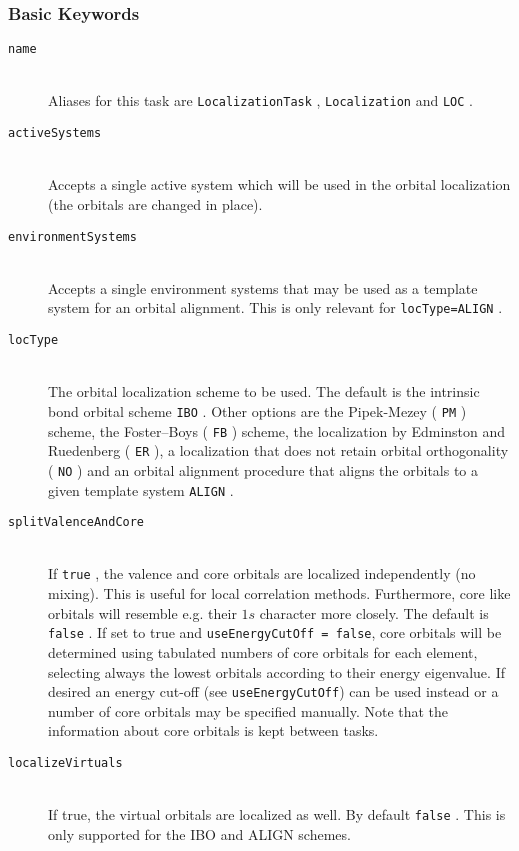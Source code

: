 \documentclass[bibliography=totocnumbered,a4paper,10pt,oneside]{scrbook}
\newcommand{\ttt}[1]{%
  \begingroup\setlength{\fboxsep}{1pt}%
  \colorbox{serenity-green!30}{\texttt{\hspace*{2pt}\vphantom{(g}#1\hspace*{2pt}}}%
  \endgroup
}
\begin{document}
\subsubsection{Basic Keywords}
\begin{description}
 \item [\texttt{name}]\hfill \\
   Aliases for this task are \ttt{LocalizationTask}, \ttt{Localization} and \ttt{LOC}.
 \item [\texttt{activeSystems}]\hfill \\
   Accepts a single active system which will be used in the orbital localization
   (the orbitals are changed in place).
 \item [\texttt{environmentSystems}]\hfill \\
   Accepts a single environment systems that may be used as a template system for an orbital alignment.
   This is only relevant for \ttt{locType=ALIGN}.
 \item [\texttt{locType}]\hfill \\
   The orbital localization scheme to be used. The default is the intrinsic bond orbital scheme \ttt{IBO}.
   Other options are the  Pipek-Mezey (\ttt{PM}) scheme, the Foster--Boys (\ttt{FB}) scheme, the localization
   by Edminston and Ruedenberg (\ttt{ER}), a localization that does not retain orbital orthogonality
   (\ttt{NO}) and an orbital alignment procedure that aligns the orbitals to a given template system \ttt{ALIGN}\cite{Bensberg2020}.
 \item [\texttt{splitValenceAndCore}]\hfill \\
   If \ttt{true}, the valence and core orbitals are localized independently (no mixing). This is useful
   for local correlation methods. Furthermore, core like orbitals will resemble e.g. their $1s$ character
   more closely. The default is \ttt{false}. If set to true and \texttt{useEnergyCutOff = false}, core
   orbitals will be determined using tabulated  numbers of core orbitals for each element, selecting always
   the lowest orbitals according to their energy eigenvalue. If desired an energy cut-off
   (see \texttt{useEnergyCutOff}) can be used instead or a number of core orbitals may be specified manually.
   Note that the information about core orbitals is kept between tasks.
 \item [\texttt{localizeVirtuals}]\hfill \\
   If true, the virtual orbitals are localized as well. By default \ttt{false}. This is only supported for the IBO and ALIGN schemes.
\end{description}
\end{document}
